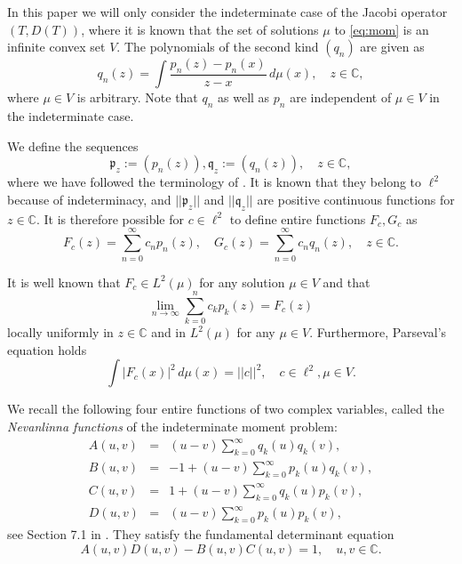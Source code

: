 \documentclass [12pt]{article}
\newcommand{\C}{\mathbb{C}}
\begin{document}
In this paper we will only consider the  indeterminate case of the Jacobi operator $(T,D(T))$, where it is known that  the set of solutions $\mu$ to \eqref{eq:mom} is an infinite convex set $V$. The polynomials of the second kind $(q_n)$ are given as
\begin{equation*}
q_n(z)=\int \frac{p_n(z)-p_n(x)}{z-x}\,d\mu(x), \quad z\in \C,
\end{equation*}
where $\mu\in V$ is arbitrary. Note that $q_n$ as well as $p_n$ are independent of $\mu\in V$ in the indeterminate case.

We define  the sequences
\begin{equation}\label{eq:frak}
 \mathfrak{p}_z:=(p_n(z)), \mathfrak{q}_z:=(q_n(z)),\quad z\in\C,
 \end{equation}
 where we have followed the terminology of \cite{Sch}. It is known that they belong to
$\ell^2$ because of indeterminacy, and
   $||\mathfrak{p}_z||$ and $||\mathfrak{q}_z||$ are positive continuous functions for $z\in\C$.  It is therefore possible 
for $c\in\ell^2$ to define entire functions $F_c, G_c$ as
\begin{equation}\label{eq:FGc}
F_c(z)=\sum_{n=0}^\infty c_np_n(z),\quad G_c(z)=\sum_{n=0}^\infty c_nq_n(z),\quad z\in\C.
\end{equation}

It is well known that $F_c\in L^2(\mu)$ for any solution $\mu\in V$ and that
$$
\lim_{n\to\infty} \sum_{k=0}^n c_kp_k(z)= F_c(z)
$$
locally uniformly in $z\in\C$ and in $L^2(\mu)$ for any $\mu\in V$. Furthermore, Parseval's equation holds
\begin{equation}\label{eq:Pars}
\int |F_c(x)|^2\,d\mu(x)=||c||^2,\quad c\in\ell^2, \mu\in V.
\end{equation}

We recall the following four entire functions of two complex variables, called the {\it Nevanlinna functions} of the indeterminate moment problem:
\begin{eqnarray}
A(u,v)&=&(u-v)\sum_{k=0}^\infty q_k(u)q_k(v)\label{eq:A},\\
B(u,v)&=&-1+(u-v)\sum_{k=0}^\infty p_k(u)q_k(v) \label{eq:B},\\
C(u,v)&=&1+(u-v)\sum_{k=0}^\infty q_k(u)p_k(v)\label{eq:C},\\
D(u,v)&=&(u-v)\sum_{k=0}^\infty p_k(u)p_k(v)\label{eq:D},
\end{eqnarray}
see Section 7.1 in \cite{Sch}. They satisfy the  fundamental determinant equation
\begin{equation}\label{eq:2vardet}
A(u,v)D(u,v)-B(u,v)C(u,v)=1, \quad u,v\in\C.
\end{equation}
 
\end{document}
